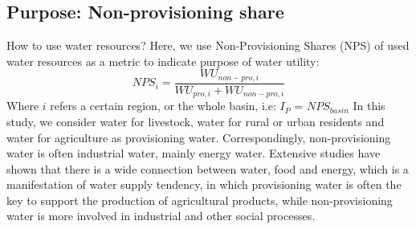 \documentclass[9pt,twoside,lineno]{pnas-new}
\begin{document}
\subsection*{Purpose: Non-provisioning share}
    How to use water resources?
    Here, we use Non-Provisioning Shares (NPS) of used water resources as a metric to indicate purpose of water utility:
    $$ NPS_{i} = \frac{WU_{non-pro, i}}{WU_{pro, i} + WU_{non-pro, i}} $$
    Where $i$ refers a certain region, or the whole basin, i.e:
	$I_P$ = $NPS_{basin}$
    In this study, we consider water for livestock, water for rural or urban residents and water for agriculture as provisioning water. Correspondingly, non-provisioning water is often industrial water, mainly energy water. Extensive studies have shown that there is a wide connection between water, food and energy, which is a manifestation of water supply tendency, in which provisioning water is often the key to support the production of agricultural products, while non-provisioning water is more involved in industrial and other social processes. %
\end{document}
